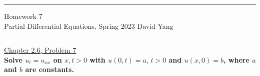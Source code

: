\documentclass[11pt]{article}
\begin{document}
	\hrule
	\begin{center}
		{\Large Homework 7} \\ %
		\vspace{0.2cm}
		Partial Differential Equations, Spring 2023 \hfill David Yang %
	\end{center}

\hrule

\vspace{1em}


\underline{Chapter 2.6, Problem 7} \\

\textbf{Solve $u_t =u_{xx}$ on $x,t>0$ with $u(0,t)=a, \, t>0$ and $u(x,0)=b$, where $a$ and $b$ are constants.} \\
\end{document}
